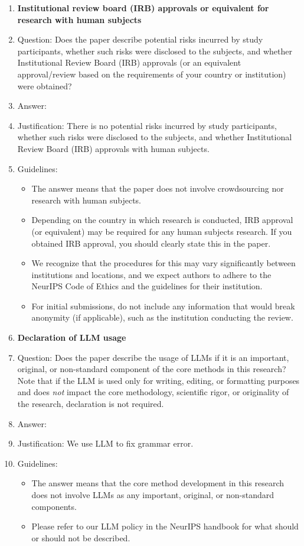 \documentclass{article}
\theoremstyle{definition}
\theoremstyle{remark}
\begin{document}
\begin{enumerate}
\item {\bf Institutional review board (IRB) approvals or equivalent for research with human subjects}
    \item[] Question: Does the paper describe potential risks incurred by study participants, whether such risks were disclosed to the subjects, and whether Institutional Review Board (IRB) approvals (or an equivalent approval/review based on the requirements of your country or institution) were obtained?
    \item[] Answer: \answerNA{} %
    \item[] Justification: There is no potential risks incurred by study participants, whether
such risks were disclosed to the subjects, and whether Institutional Review Board (IRB)
approvals 
with human subjects.
    \item[] Guidelines:
    \begin{itemize}
        \item The answer \answerNA{} means that the paper does not involve crowdsourcing nor research with human subjects.
        \item Depending on the country in which research is conducted, IRB approval (or equivalent) may be required for any human subjects research. If you obtained IRB approval, you should clearly state this in the paper. 
        \item We recognize that the procedures for this may vary significantly between institutions and locations, and we expect authors to adhere to the NeurIPS Code of Ethics and the guidelines for their institution. 
        \item For initial submissions, do not include any information that would break anonymity (if applicable), such as the institution conducting the review.
    \end{itemize}

\item {\bf Declaration of LLM usage}
    \item[] Question: Does the paper describe the usage of LLMs if it is an important, original, or non-standard component of the core methods in this research? Note that if the LLM is used only for writing, editing, or formatting purposes and does \emph{not} impact the core methodology, scientific rigor, or originality of the research, declaration is not required.
    \item[] Answer: \answerNA{} %
    \item[] Justification: We use LLM to fix grammar error.
    \item[] Guidelines:
    \begin{itemize}
        \item The answer \answerNA{} means that the core method development in this research does not involve LLMs as any important, original, or non-standard components.
        \item Please refer to our LLM policy in the NeurIPS handbook for what should or should not be described.
    \end{itemize}

\end{enumerate}
\end{document}
